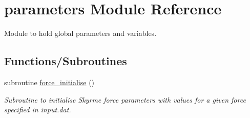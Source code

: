 \hypertarget{namespaceparameters}{}\section{parameters Module Reference}
\label{namespaceparameters}


Module to hold global parameters and variables.  


\subsection*{Functions/\+Subroutines}
\begin{DoxyCompactItemize}
\item 
subroutine \mbox{\hyperlink{namespaceparameters_a55242f635842d12dbb53d66ae9248b93}{force\+\_\+initialise}} ()
\begin{DoxyCompactList}\small\item\em Subroutine to initialise Skyrme force parameters with values for a given force specified in \textquotesingle{}input.\+dat\textquotesingle{}. \end{DoxyCompactList}\end{DoxyCompactItemize}
